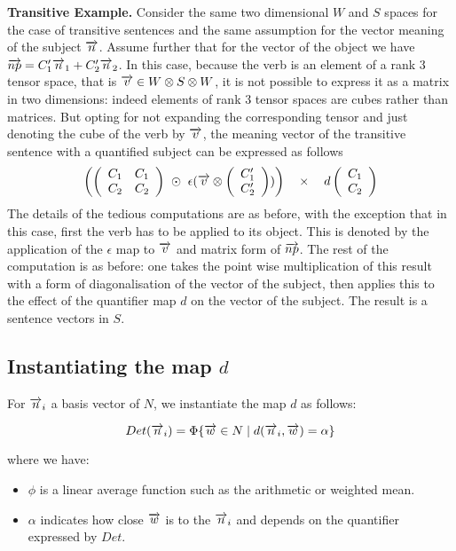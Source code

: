 \smallskip
\noindent
{\bf Transitive Example.}
Consider the same two dimensional $W$ and $S$ spaces for the case of transitive sentences and the same assumption for the vector meaning of the subject $\overrightarrow{n}$. Assume further that for the vector of the object we have $\overrightarrow{np} = C'_1 \overrightarrow{n}_1 + C'_2 \overrightarrow{n}_2$. In this case, because the verb is an element of a rank 3 tensor space, that is $\overrightarrow{v} \in W \otimes S \otimes W$, it is not possible to express it as a matrix in two dimensions: indeed elements of  rank 3 tensor   spaces are cubes rather than matrices. But opting for not expanding the corresponding tensor and just denoting the cube of the verb by $\overrightarrow{v}$, the meaning vector of the transitive sentence with a quantified subject can be expressed as follows
\[
\left(
 \left ( \begin{array}{cc}
 C_1 & C_1\\ C_2 & C_2
  \end{array} \right)
 \ \odot \ 
\epsilon (\ov{v} \otimes\left (\begin{array}{c} C'_1 \\C'_2 \end{array} \right) ) \right)
 \quad \times \quad
 d\left ( \begin{array}{c} C_1 \\ C_2 \end{array} \right )
\]
The details of the tedious computations are as before, with the exception that in this case, first the verb has to be applied to its object. This is denoted by the application of the $\epsilon$ map to $\overrightarrow{v}$ and matrix form of $\overrightarrow{np}$. The rest of the computation is as before: one takes the point wise multiplication of this result with a form of diagonalisation of the vector of the subject, then applies this to the effect of the quantifier map $d$ on the vector of the subject. The result is a sentence vectors in $S$. 

\subsection{Instantiating the map $d$} 

For $\overrightarrow{n}_i$ a basis vector of $N$, we instantiate  the map $d$  as follows:

\begin{equation}\label{eqDet}
Det(\overrightarrow{n}_i) = \Phi \{\overrightarrow{w} \in N \mid d(\overrightarrow{n}_i, \overrightarrow{w}) = \alpha\}
\end{equation}

\noindent
where we have:
\begin{itemize}
\item  $\phi$ is a linear average function such as the   arithmetic or weighted mean. 
\item  $\alpha$ indicates how close $\overrightarrow{w}$ is to the $\overrightarrow{n}_i$ and depends on the quantifier expressed by $Det$. 
\end{itemize}

